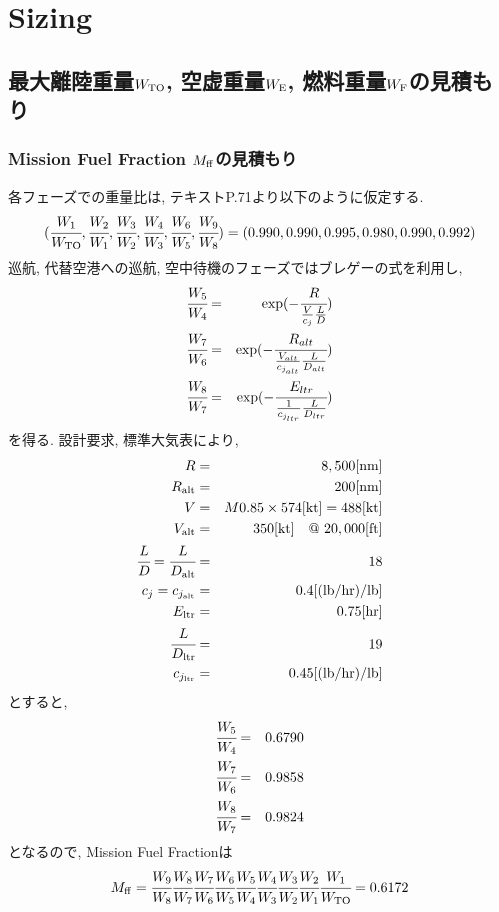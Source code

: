 \documentclass[12pt]{jsarticle}
\begin{document}
\section{Sizing}
\subsection{最大離陸重量$W_{\rm TO}$, 空虚重量$W_{\rm E}$, 燃料重量$W_{\rm F}$の見積もり}
\subsubsection{Mission Fuel Fraction $M_{\rm ff}$の見積もり}
各フェーズでの重量比は, テキストP.71より以下のように仮定する.
\begin{eqnarray*}
	(\cfrac{W_1}{W_{\rm TO}}, \cfrac{W_2}{W_1}, \cfrac{W_3}{W_2}, \cfrac{W_4}{W_3}, \cfrac{W_6}{W_5}, \cfrac{W_9}{W_8}) = (0.990, 0.990, 0.995, 0.980, 0.990, 0.992)
\end{eqnarray*}
巡航, 代替空港への巡航, 空中待機のフェーズではブレゲーの式を利用し,
\begin{eqnarray*}
	\cfrac{W_5}{W_4} &=& \exp(-\cfrac{R}{\frac{V}{c_j}\frac{L}{D}}) \\
	\cfrac{W_7}{W_6} &=& \exp(-\cfrac{R_{alt}}{\frac{V_{alt}}{c_{j_{alt}}}\frac{L}{D_{alt}}}) \\
	\cfrac{W_8}{W_7} &=& \exp(-\cfrac{E_{ltr}}{\frac{1}{c_{j_{ltr}}}\frac{L}{D_{ltr}}})
\end{eqnarray*}
を得る. 設計要求, 標準大気表により,
\begin{eqnarray*}
	R &=& 8,500 [\rm nm] \\
	R_{\rm alt} &=& 200 [\rm nm] \\
	V &=& M 0.85 \times 574 [\rm kt] = 488 [\rm kt] \\
	V_{\rm alt} &=& 350 [\rm kt]\quad @ \ 20,000 [\rm ft] \\
	\cfrac{L}{D} = \cfrac{L}{D_{\rm alt}} &=& 18 \\
	c_j = c_{j_{\rm alt}} &=& 0.4 [\rm (lb/hr)/lb] \\
	E_{\rm ltr} &=& 0.75 [\rm hr] \\
	\cfrac{L}{D_{\rm ltr}} &=& 19 \\
	c_{j_{\rm ltr}} &=& 0.45 [\rm (lb/hr)/lb]
\end{eqnarray*}
とすると, 
\begin{eqnarray*}
	\cfrac{W_5}{W_4} &=& 0.6790 \\
	\cfrac{W_7}{W_6} &=& 0.9858 \\
	\cfrac{W_8}{W_7} &=& 0.9824
\end{eqnarray*}
となるので, Mission Fuel Fractionは
\begin{eqnarray*}
	M_{\rm ff} = \cfrac{W_9}{W_8}\cfrac{W_8}{W_7}\cfrac{W_7}{W_6}\cfrac{W_6}{W_5}\cfrac{W_5}{W_4}\cfrac{W_4}{W_3}\cfrac{W_3}{W_2}\cfrac{W_2}{W_1}\cfrac{W_1}{W_{\rm TO}} = 0.6172
\end{eqnarray*}
\end{document}
